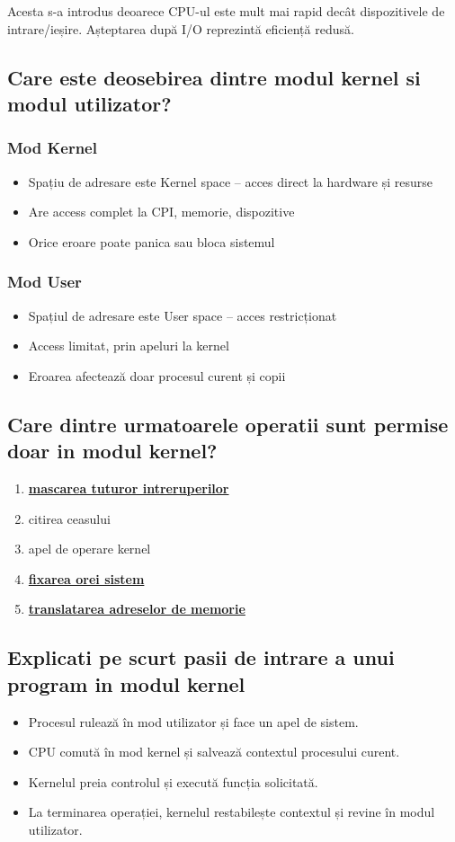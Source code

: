 \documentclass[11pt]{article}
\begin{document}
Acesta s-a introdus deoarece CPU-ul este mult mai rapid decât dispozitivele de intrare/ieșire. Așteptarea după I/O reprezintă eficiență redusă.
\subsection{Care este deosebirea dintre modul kernel si modul utilizator?}
\label{sec:orgf980602}
\subsubsection{Mod Kernel}
\label{sec:org68c6366}
\begin{itemize}
\item Spațiu de adresare este Kernel space -- acces direct la hardware și resurse
\item Are access complet la CPI, memorie, dispozitive
\item Orice eroare poate panica sau bloca sistemul
\end{itemize}
\subsubsection{Mod User}
\label{sec:orgf62cca8}
\begin{itemize}
\item Spațiul de adresare este User space -- acces restricționat
\item Access limitat, prin apeluri la kernel
\item Eroarea afectează doar procesul curent și copii
\end{itemize}
\subsection{Care dintre urmatoarele operatii sunt permise doar in modul kernel?}
\label{sec:org40c7803}
\begin{enumerate}
\item \uline{\textbf{mascarea tuturor intreruperilor}}
\item citirea ceasului
\item apel de operare kernel
\item \uline{\textbf{fixarea orei sistem}}
\item \uline{\textbf{translatarea adreselor de memorie}}
\end{enumerate}
\subsection{Explicati pe scurt pasii de intrare a unui program in modul kernel}
\label{sec:org4981942}
\begin{itemize}
\item Procesul rulează în mod utilizator și face un apel de sistem.
\item CPU comută în mod kernel și salvează contextul procesului curent.
\item Kernelul preia controlul și execută funcția solicitată.
\item La terminarea operației, kernelul restabilește contextul și revine în modul utilizator.
\end{itemize}
\end{document}
